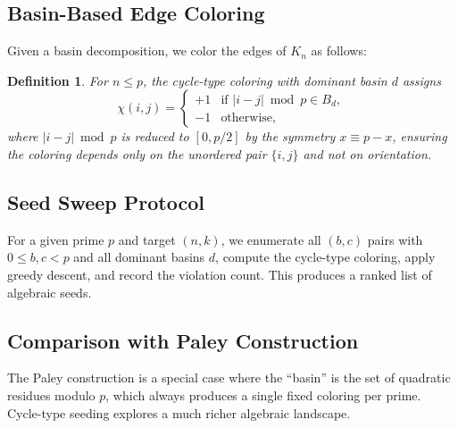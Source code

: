 \documentclass[11pt,a4paper]{article}
\theoremstyle{plain}
\newtheorem{definition}[theorem]{Definition}
\theoremstyle{remark}
\newcommand{\abs}[1]{\lvert #1 \rvert}
\begin{document}
\subsection{Basin-Based Edge Coloring}

Given a basin decomposition, we color the edges of $K_n$ as follows:

\begin{definition}
For $n \leq p$, the \emph{cycle-type coloring} with dominant
basin $d$ assigns
\[
  \chi(i,j) = \begin{cases}
    +1 & \text{if } \abs{i - j} \bmod p \in B_d, \\
    -1 & \text{otherwise,}
  \end{cases}
\]
where $\abs{i-j} \bmod p$ is reduced to $[0, p/2]$ by the
symmetry $x \equiv p - x$, ensuring the coloring depends only on
the unordered pair $\{i,j\}$ and not on orientation.
\end{definition}

\subsection{Seed Sweep Protocol}

For a given prime $p$ and target $(n, k)$, we enumerate all
$(b, c)$ pairs with $0 \leq b, c < p$ and all dominant basins $d$,
compute the cycle-type coloring, apply greedy descent, and record
the violation count. This produces a ranked list of algebraic seeds.

\subsection{Comparison with Paley Construction}

The Paley construction is a special case where the ``basin'' is the
set of quadratic residues modulo $p$, which always produces a
single fixed coloring per prime. Cycle-type seeding explores a much
richer algebraic landscape.
\end{document}
